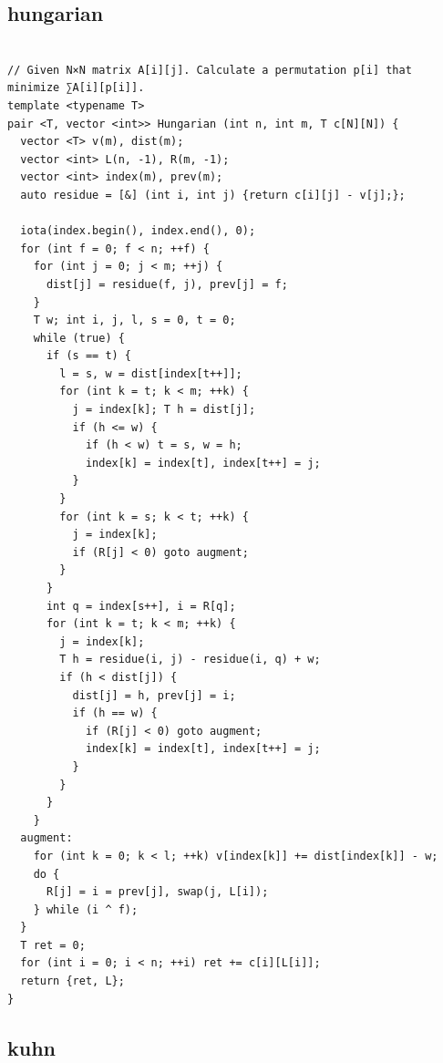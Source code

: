 \documentclass[9pt, landscape, a4paper,twosided]{extarticle}
\begin{document}
\begin{multicols*}{3}
\subsection{hungarian}
\begin{verbatim}

// Given N×N matrix A[i][j]. Calculate a permutation p[i]​ that minimize ∑A[i][p[i]]​.
template <typename T>
pair <T, vector <int>> Hungarian (int n, int m, T c[N][N]) {
  vector <T> v(m), dist(m);
  vector <int> L(n, -1), R(m, -1);
  vector <int> index(m), prev(m);
  auto residue = [&] (int i, int j) {return c[i][j] - v[j];};

  iota(index.begin(), index.end(), 0);
  for (int f = 0; f < n; ++f) {
    for (int j = 0; j < m; ++j) {
      dist[j] = residue(f, j), prev[j] = f;
    }
    T w; int i, j, l, s = 0, t = 0;
    while (true) {
      if (s == t) {
        l = s, w = dist[index[t++]];
        for (int k = t; k < m; ++k) {
          j = index[k]; T h = dist[j];
          if (h <= w) {
            if (h < w) t = s, w = h;
            index[k] = index[t], index[t++] = j;
          }
        }
        for (int k = s; k < t; ++k) {
          j = index[k];
          if (R[j] < 0) goto augment;
        }
      }
      int q = index[s++], i = R[q];
      for (int k = t; k < m; ++k) {
        j = index[k];
        T h = residue(i, j) - residue(i, q) + w;
        if (h < dist[j]) {
          dist[j] = h, prev[j] = i;
          if (h == w) {
            if (R[j] < 0) goto augment;
            index[k] = index[t], index[t++] = j;
          }
        }
      }
    }
  augment:
    for (int k = 0; k < l; ++k) v[index[k]] += dist[index[k]] - w;
    do {
      R[j] = i = prev[j], swap(j, L[i]);
    } while (i ^ f);
  }
  T ret = 0;
  for (int i = 0; i < n; ++i) ret += c[i][L[i]];
  return {ret, L};
}
\end{verbatim}

\subsection{kuhn}
\begin{verbatim}


\end{verbatim}
\end{multicols*}
\end{document}
